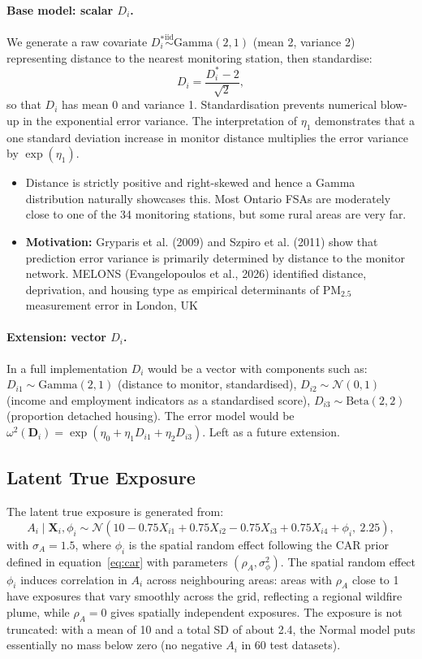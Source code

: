 \documentclass[11pt]{article}
\begin{document}
\paragraph{Base model: scalar $D_i$.}
We generate a raw covariate $D_i^* \overset{\text{iid}}{\sim} \text{Gamma}(2, 1)$
(mean 2, variance 2) representing distance to the nearest monitoring station, then
standardise:
\[
D_i = \frac{D_i^* - 2}{\sqrt{2}},
\]
so that $D_i$ has mean 0 and variance 1. Standardisation prevents numerical blow-up in
the exponential error variance. The interpretation of $\eta_1$
demonstrates that a one standard deviation increase in monitor distance multiplies the error
variance by $\exp(\eta_1)$.
\begin{itemize}
\item Distance is strictly positive and right-skewed and hence a Gamma distribution naturally showcases this.
Most Ontario FSAs are moderately close to one of the 34 monitoring stations, but some rural
areas are very far.

\item \textbf{Motivation:} Gryparis et al. (2009) and Szpiro et al. (2011)
show that prediction error variance is primarily determined by distance to the
monitor network. MELONS (Evangelopoulos et al., 2026) identified distance, deprivation,
and housing type as empirical determinants of PM$_{2.5}$ measurement error in London, UK
\end{itemize}

\paragraph{Extension: vector $D_i$.}
In a full implementation $D_i$ would be a vector with components such as:
$D_{i1} \sim \text{Gamma}(2,1)$ (distance to monitor, standardised),
$D_{i2} \sim \mathcal{N}(0,1)$ (income and employment indicators as a standardised
score), $D_{i3} \sim \text{Beta}(2,2)$ (proportion detached housing).
The error model would be $\omega^2(\mathbf{D}_i) = \exp(\eta_0 + \eta_1 D_{i1} +
\eta_2 D_{i3})$. Left as a future extension.

\subsection{Latent True Exposure}

The latent true exposure is generated from:
\begin{equation}
A_i \mid \mathbf{X}_i, \phi_i \sim \mathcal{N}\!\left(10 - 0.75X_{i1} + 0.75X_{i2} -
0.75X_{i3} + 0.75X_{i4} + \phi_i,\ 2.25\right), \label{eq:exposure}
\end{equation}
with $\sigma_A = 1.5$, where $\phi_i$ is the spatial random effect following the CAR prior
defined in equation~\eqref{eq:car} with parameters $(\rho_A, \sigma_\phi^2)$. The spatial
random effect $\phi_i$ induces correlation in $A_i$ across neighbouring areas: areas with
$\rho_A$ close to 1 have exposures that vary smoothly across the grid, reflecting a
regional wildfire plume, while $\rho_A = 0$ gives spatially independent exposures.
The exposure is not truncated: with a mean of 10 and a total SD of about 2.4, the Normal model puts
essentially no mass below zero (no negative $A_i$ in 60 test datasets).
\end{document}
